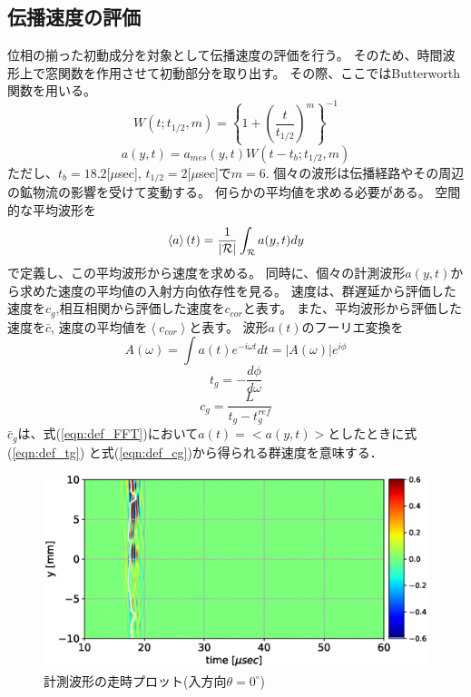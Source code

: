 \subsection{伝播速度の評価}
位相の揃った初動成分を対象として伝播速度の評価を行う。
そのため、時間波形上で窓関数を作用させて初動部分を取り出す。
その際、ここではButterworth関数を用いる。
\begin{equation}
	W(t;t_{1/2},m)=
	\left\{
		1+\left(\frac{t}{t_{1/2}}\right)^m
	\right\}^{-1}
\end{equation}
\begin{equation}
	a(y,t)=a_{mes}(y,t)W(t-t_b;t_{1/2},m)
\end{equation}
ただし、$t_b=18.2$[$\mu$sec], $t_{1/2}=2$[$\mu$sec]で$m=6$.
個々の波形は伝播経路やその周辺の鉱物流の影響を受けて変動する。
何らかの平均値を求める必要がある。
空間的な平均波形を
\begin{equation}
	\left< a\right>(t)=
	\frac{1}{\left| {\cal R}\right|}\int_{\cal R}a(y,t)dy
	\label{eqn:def_mean_wv}
\end{equation}
で定義し、この平均波形から速度を求める。
同時に、個々の計測波形$a(y,t)$から求めた速度の平均値の入射方向依存性を見る。
速度は、群遅延から評価した速度を$c_g$,相互相関から評価した速度を$c_{cor}$と表す。
また、平均波形から評価した速度を$\bar c$, 速度の平均値を$\left< c_{cor}\right>$と表す。
波形$a(t)$のフーリエ変換を
\begin{equation}
	A(\omega)=\int a(t)e^{-i\omega t}dt=\left| A(\omega) \right|e^{i\phi}
	\label{eqn:def_FFT}
\end{equation}
\begin{equation}
	t_g=-\frac{d\phi}{d\omega}
	\label{eqn:}
\end{equation}
\begin{equation}
	c_g=\frac{L}{t_g-t_g^{ref}}
	\label{eqn:def_cg}
\end{equation}
$\bar{c}_g$は、式(\ref{eqn:def_FFT})において$a(t)=<a(y,t)>$としたときに式(\ref{eqn:def_tg})
と式(\ref{eqn:def_cg})から得られる群速度を意味する．
\begin{figure}[h]
	\begin{center}
	\includegraphics[width=0.7\linewidth]{Figs/fig6.eps} 
	\end{center}
	\caption{
		計測波形の走時プロット(入方向$\theta=0^{\circ}$)
	} 
	\label{fig:fig6}
\end{figure}
